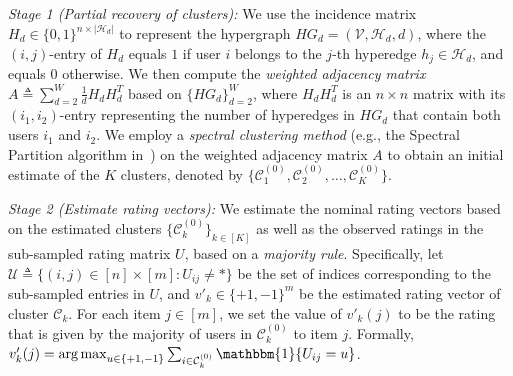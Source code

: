 \documentclass{article}
\DeclareMathOperator*{\argmax}{arg\,max}
\begin{document}

\emph{Stage 1 (Partial recovery of clusters):}
We use the incidence matrix $H_d \in \{0, 1\}^{n \times |\mathcal{H}_d|}$ to represent the hypergraph $HG_d = (\mathcal{V}, \mathcal{H}_d, d)$, where the $(i, j)$-entry of $H_d$ equals $1$ if user $i$ belongs to the $j$-th hyperedge $h_j \in \mathcal{H}_d$, and equals $0$ otherwise. We then compute the \emph{weighted adjacency matrix} $A \triangleq \sum_{d=2}^W \frac{1}{d} H_d H_d^T$ based on $\{HG_d\}_{d=2}^W$,
where $H_d H_d^T$ is an $n \times n$ matrix with its $(i_1,i_2)$-entry representing the number of hyperedges in $HG_d$ that contain both users $i_1$ and $i_2$. We employ a \emph{spectral clustering method} (e.g., the Spectral Partition algorithm in~\cite{yun2016optimal}) on the weighted adjacency matrix $A$ to obtain an initial estimate of the $K$ clusters,  denoted by  $\{ \mathcal{C}_1^{(0)}, \mathcal{C}_2^{(0)}, \ldots, \mathcal{C}_K^{(0)}\}$. 




\emph{Stage 2 (Estimate rating vectors):} 
We estimate the nominal rating vectors based on the estimated clusters $\{ \mathcal{C}_k^{(0)}\}_{k \in [K]}$ as well as the observed ratings in the sub-sampled rating matrix $U$, based on a \emph{majority rule}. Specifically, let $\mathcal{U} \triangleq \{(i,j) \in [n] \times [m]: U_{ij} \ne * \}$ be the set of indices corresponding to the sub-sampled entries in $U$, and $v'_k \in \{+1,-1\}^m$ be the estimated rating vector of cluster $\mathcal{C}_k$. For each item $j \in [m]$, we set the value of $v'_k(j)$ to be the rating that is given by the majority of users in $\mathcal{C}_k^{(0)}$ to item $j$. Formally, $v'_k(j) = \argmax_{u\in\{+1,-1\}} \sum_{i \in \mathcal{C}_k^{(0)}} \mathbbm{1}\{U_{ij} = u\}$.
\end{document}
